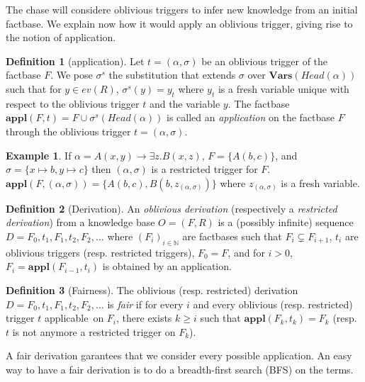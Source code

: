 \documentclass{article}
\theoremstyle{definition}
\newtheorem{definition}{Definition}[section]
\newtheorem{example}{Example}[section]
\theoremstyle{remark}
\def \N {\mathbb N}
\newcommand{\Vars}{\textbf{Vars}}
\newcommand{\Appl}{\textbf{appl}}
\begin{document}
The chase will considere oblivious triggers to infer new knowledge from an initial factbase. We explain now how it would apply an oblivious trigger, giving rise to the notion of application. 

\begin{definition}[application]
Let $t = (\alpha,\sigma)$ be an oblivious trigger of the factbase $F$. We pose \emph{$\sigma^s$} the substitution that extends $\sigma$ over $\Vars(\textit{Head}(\alpha))$ such that for $y \in \textit{ev}(R)$, $\sigma^s(y) = y_t$ where $y_t$ is a fresh variable unique with respect to the oblivious trigger $t$ and the variable $y$.
The factbase $\Appl(F,t)=F \cup \sigma^s(\textit{Head}(\alpha))$ is called an \emph{application} on the factbase $F$ through the oblivious trigger $t = (\alpha,\sigma)$.
\end{definition}

\begin{example} If $\alpha = A(x,y) \rightarrow \exists z.B(x,z)$, $F = \{A(b,c)\}$, and $\sigma = \{x \mapsto b, y \mapsto c \}$ then $(\alpha,\sigma)$ is a restricted trigger for $F$. $\Appl(F,(\alpha,\sigma)) = \{A(b,c),B(b,z_{(\alpha,\sigma)})\}$ where $z_{(\alpha,\sigma)}$ is a fresh variable.
\end{example}

\begin{definition}[Derivation]
An \emph{oblivious derivation} (respectively a \emph{restricted derivation}) from a knowledge base $O= (F,R)$ is a (possibly infinite) sequence $D=F_0,t_1,F_1,t_2,F_2,\ldots$ where $(F_i)_{i \in \N}$ are factbases such that $F_i \subsetneq F_{i+1}$, $t_i$ are oblivious triggers (resp. restricted triggers), $F_0 = F$, and for $i >0$, $F_{i}= \Appl(F_{i-1},t_i)$ is obtained by an application.\todo{and $F_{i}= \Appl(F_{i-1},t_i)$ for all $i > 0$.}
\end{definition}


\begin{definition}[Fairness]
The oblivious (resp. restricted) derivation $D=F_0,t_1,F_1,t_2,F_2,\ldots$ is \emph{fair} if for every $i$ and every oblivious (resp. restricted) trigger $t$ applicable\ on $F_i$, there exists $k \geq i$ such that $\Appl(F_{k},t_k) = F_k$ (resp. $t$ is not anymore a restricted trigger on $F_k$).
\end{definition}

A fair derivation garantees that we consider every possible application. An easy way to have a fair derivation is to do a breadth-first search (BFS) on the terms.
\end{document}
